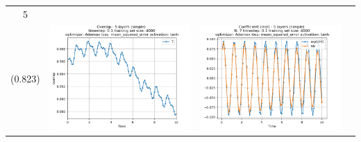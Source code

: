\documentclass{article}
\begin{document}
\begin{tabular}{|c|c|c|c|} \hline

     5 \\ (0.823) &
     \includegraphics[scale=0.37]{./5_layers_simple_train_samples=4000_timestep=0.1_t_total=10.0_optimizer=Adamax_loss=mean_squared_error_activation=tanh/Overlap.png} &
     \includegraphics[scale=0.37]{./5_layers_simple_train_samples=4000_timestep=0.1_t_total=10.0_optimizer=Adamax_loss=mean_squared_error_activation=tanh/Coeff_N=7_(real).png} &

\end{tabular}
\end{document}
